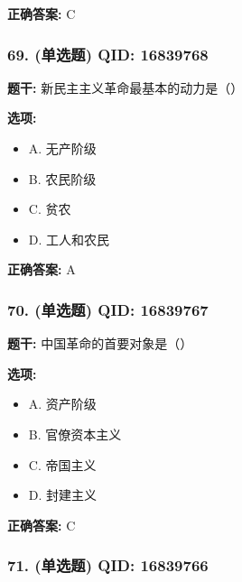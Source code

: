 \documentclass[12pt,UTF8]{ctexart}
\begin{document}
\textbf{正确答案:}
C

\vspace{0.3em}\hrulefill\vspace{0.7em}

\subsubsection*{69. (单选题) \small QID: 16839768}

\textbf{题干:}
新民主主义革命最基本的动力是（）

\textbf{选项:}
\begin{itemize}[leftmargin=*]

  \item A. 无产阶级

  \item B. 农民阶级

  \item C. 贫农

  \item D. 工人和农民

\end{itemize}

\textbf{正确答案:}
A

\vspace{0.3em}\hrulefill\vspace{0.7em}

\subsubsection*{70. (单选题) \small QID: 16839767}

\textbf{题干:}
中国革命的首要对象是（）

\textbf{选项:}
\begin{itemize}[leftmargin=*]

  \item A. 资产阶级

  \item B. 官僚资本主义

  \item C. 帝国主义

  \item D. 封建主义

\end{itemize}

\textbf{正确答案:}
C

\vspace{0.3em}\hrulefill\vspace{0.7em}

\subsubsection*{71. (单选题) \small QID: 16839766}
\end{document}
